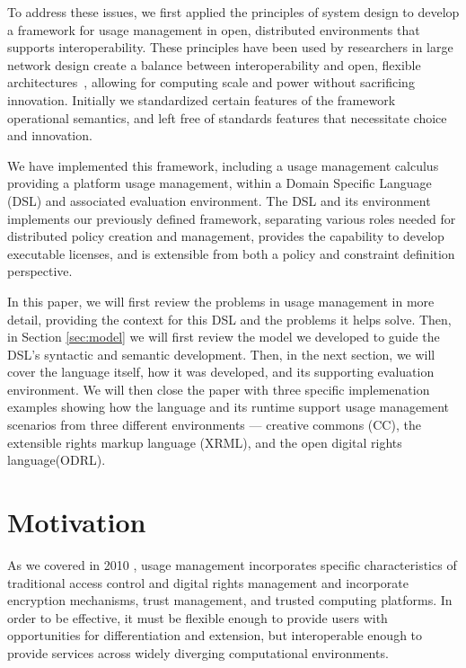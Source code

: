 To address these issues, we first applied the principles of system design to develop a framework for usage management in open, distributed environments that supports interoperability. These principles have been used by researchers in large network design create a balance between interoperability and open, flexible architectures~\cite{Al:04,BlCl:01,ClWrSoBr:02}, allowing for computing scale and power without sacrificing innovation. Initially we standardized certain features of the framework operational semantics, and left free of standards features that necessitate choice and innovation.

We have implemented this framework, including a usage management calculus providing a platform usage management, within a Domain Specific Language (DSL) and associated evaluation environment. The DSL and its environment implements our previously defined framework, separating various roles needed for distributed policy creation and management, provides the capability to develop executable licenses, and is extensible from both a policy and constraint definition perspective.

In this paper, we will first review the problems in usage management in more detail, providing the context for this DSL and the problems it helps solve.  Then, in Section \ref{sec:model} we will first review the model we developed to guide the DSL's syntactic and semantic development.  Then, in the next section, we will cover the language itself, how it was developed, and its supporting evaluation environment.  We will then close the paper with three specific implemenation examples showing how the language and its runtime support usage management scenarios from three different environments --- creative commons (CC), the extensible rights markup language (XRML), and the open digital rights language(ODRL).

\section{Motivation}\label{sec:motivation}
As we covered in 2010 \cite{Jamkhedkar:2010:IUM:1866870.1866885}, usage management incorporates specific characteristics of traditional access control and digital rights management and incorporate encryption mechanisms, trust management, and trusted computing platforms.  In order to be effective, it must be flexible enough to provide users with opportunities for differentiation and extension, but interoperable enough to provide services across widely diverging computational environments.

